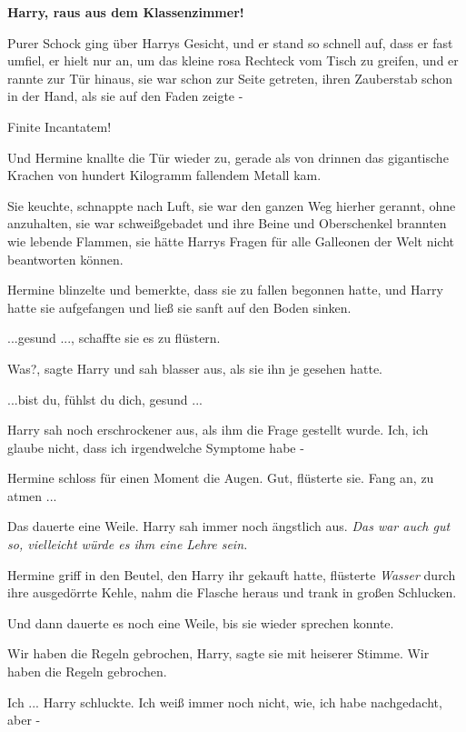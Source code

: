 \textbf{\glqq{}Harry, raus aus dem Klassenzimmer!\grqq{}}

Purer Schock ging über Harrys Gesicht, und er stand so schnell auf, dass er fast
umfiel, er hielt nur an, um das kleine rosa Rechteck vom Tisch zu greifen, und
er rannte zur Tür hinaus, sie war schon zur Seite getreten, ihren Zauberstab
schon in der Hand, als sie auf den Faden zeigte -

\glqq{}Finite Incantatem!\grqq{}

Und Hermine knallte die Tür wieder zu, gerade als von drinnen das gigantische
Krachen von hundert Kilogramm fallendem Metall kam.

Sie keuchte, schnappte nach Luft, sie war den ganzen Weg hierher gerannt, ohne
anzuhalten, sie war schweißgebadet und ihre Beine und Oberschenkel brannten wie
lebende Flammen, sie hätte Harrys Fragen für alle Galleonen der Welt nicht
beantworten können.

Hermine blinzelte und bemerkte, dass sie zu fallen begonnen hatte, und Harry
hatte sie aufgefangen und ließ sie sanft auf den Boden sinken.

\glqq{}...gesund ...\grqq{}, schaffte sie es zu flüstern.

\glqq{}Was?\grqq{}, sagte Harry und sah blasser aus, als sie ihn je gesehen
hatte.

\glqq{}...bist du, fühlst du dich, gesund ...\grqq{}

Harry sah noch erschrockener aus, als ihm die Frage gestellt wurde. \glqq{}Ich,
ich glaube nicht, dass ich irgendwelche Symptome habe -\grqq{}

Hermine schloss für einen Moment die Augen. \glqq{}Gut\grqq{}, flüsterte sie.
\glqq{}Fang an, zu atmen ...\grqq{}

Das dauerte eine Weile. Harry sah immer noch ängstlich aus.
\emph{Das war auch gut so, vielleicht würde es ihm eine Lehre sein.}

Hermine griff in den Beutel, den Harry ihr gekauft hatte, flüsterte \glqq{}
\emph{Wasser}\grqq{} durch ihre ausgedörrte Kehle, nahm die Flasche heraus und
trank in großen Schlucken.

Und dann dauerte es noch eine Weile, bis sie wieder sprechen konnte.

\glqq{}Wir haben die Regeln gebrochen, Harry\grqq{}, sagte sie mit heiserer
Stimme. \glqq{}Wir haben die Regeln gebrochen.\grqq{}

\glqq{}Ich ...\grqq{} Harry schluckte. \glqq{}Ich weiß immer noch nicht, wie, ich
habe nachgedacht, aber -\grqq{}

